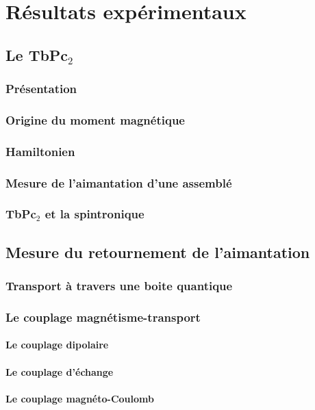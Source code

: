 \chapter{Résultats expérimentaux}

\section{Le TbPc$_2$}
\subsection{Présentation}
\subsection{Origine du moment magnétique}
\subsection{Hamiltonien}
\subsection{Mesure de l'aimantation d'une assemblé}
\subsection{TbPc$_2$ et la spintronique}


\section{Mesure du retournement de l'aimantation}
\subsection{Transport à travers une boite quantique}
\subsection{Le couplage magnétisme-transport}
\subsubsection{Le couplage dipolaire}
\subsubsection{Le couplage d'échange}
\subsubsection{Le couplage magnéto-Coulomb}
